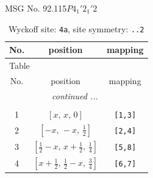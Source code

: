 \documentclass[fleqn,8pt]{jsarticle}
\begin{document}
\setcounter{MaxMatrixCols}{32}

\renewcommand{\tablename}{Table~}
\renewcommand{\figurename}{Figure~}
\begin{center}
\LARGE
MSG No. 92.115\quad$P4_{1}'2_{1}'2$
\end{center}
\renewcommand{\arraystretch}{1.2}
\begin{longtable}{ccc}
\caption{Wyckoff site: {\tt 4a}, site symmetry: {\tt ..2}}
 \\
 \hline \hline
No. & position & mapping \\ \hline \endfirsthead

\multicolumn{2}{l}{\tablename\ \thetable{}} \\
 \hline \hline
No. & position & mapping \\ \hline \endhead

 \hline \hline
\multicolumn{2}{r}{\footnotesize\it continued ...} \\ \endfoot

 \hline \hline
\multicolumn{2}{r}{} \\ \endlastfoot

1 & $\left[ x,\, x,\, 0 \right]$ & {\tt [1,3]} \\ \hline
2 & $\left[ - x,\, - x,\, \frac{1}{2} \right]$ & {\tt [2,4]} \\ \hline
3 & $\left[ \frac{1}{2} - x,\, x + \frac{1}{2},\, \frac{1}{4} \right]$ & {\tt [5,8]} \\ \hline
4 & $\left[ x + \frac{1}{2},\, \frac{1}{2} - x,\, \frac{3}{4} \right]$ & {\tt [6,7]} \\
\end{longtable}
\renewcommand{\arraystretch}{1.2}
\end{document}
